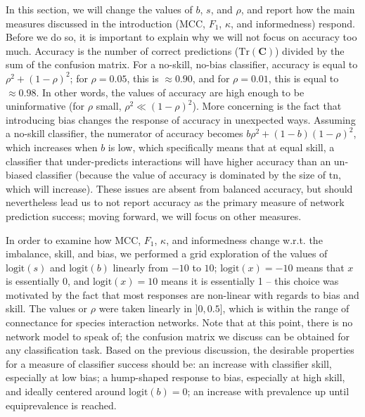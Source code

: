 \documentclass[10pt,oneside]{article}
\begin{document}
In this section, we will change the values of \(b\), \(s\), and
\(\rho\), and report how the main measures discussed in the introduction
(MCC, \(F_1\), \(\kappa\), and informedness) respond. Before we do so,
it is important to explain why we will not focus on accuracy too much.
Accuracy is the number of correct predictions
(\(\text{Tr}(\mathbf{C})\)) divided by the sum of the confusion matrix.
For a no-skill, no-bias classifier, accuracy is equal to
\(\rho^2 + (1-\rho)^2\); for \(\rho = 0.05\), this is \(\approx 0.90\),
and for \(\rho = 0.01\), this is equal to \(\approx 0.98\). In other
words, the values of accuracy are high enough to be uninformative (for
\(\rho\) small, \(\rho^2 \ll (1-\rho)^2\)). More concerning is the fact
that introducing bias changes the response of accuracy in unexpected
ways. Assuming a no-skill classifier, the numerator of accuracy becomes
\(b\rho^2 + (1-b)(1-\rho)^2\), which increases when \(b\) is low, which
specifically means that at equal skill, a classifier that under-predicts
interactions will have higher accuracy than an un-biased classifier
(because the value of accuracy is dominated by the size of tn, which
will increase). These issues are absent from balanced accuracy, but
should nevertheless lead us to not report accuracy as the primary
measure of network prediction success; moving forward, we will focus on
other measures.

In order to examine how MCC, \(F_1\), \(\kappa\), and informedness
change w.r.t. the imbalance, skill, and bias, we performed a grid
exploration of the values of \(\text{logit}(s)\) and \(\text{logit}(b)\)
linearly from \(-10\) to \(10\); \(\text{logit}(x) = -10\) means that
\(x\) is essentially 0, and \(\text{logit}(x) = 10\) means it is
essentially 1 -- this choice was motivated by the fact that most
responses are non-linear with regards to bias and skill. The values or
\(\rho\) were taken linearly in \(]0, 0.5]\), which is within the range
of connectance for species interaction networks. Note that at this
point, there is no network model to speak of; the confusion matrix we
discuss can be obtained for any classification task. Based on the
previous discussion, the desirable properties for a measure of
classifier success should be: an increase with classifier skill,
especially at low bias; a hump-shaped response to bias, especially at
high skill, and ideally centered around \(\text{logit}(b)=0\); an
increase with prevalence up until equiprevalence is reached.
\end{document}
